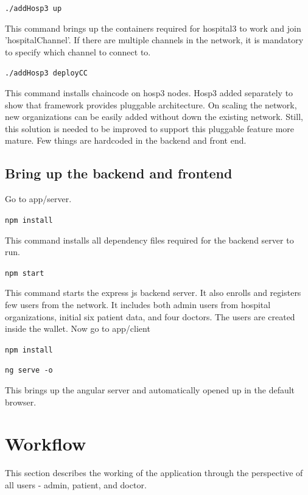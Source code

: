 \lstinline{./addHosp3 up}

This command brings up the containers required for hospital3 to work and join 'hospitalChannel'. If there are multiple channels in the network, it is mandatory to specify which channel to connect to. 

\lstinline{./addHosp3 deployCC} 

This command installs chaincode on hosp3 nodes. Hosp3 added separately to show that framework provides pluggable architecture. On scaling the network, new organizations can be easily added without down the existing network. Still, this solution is needed to be improved to support this pluggable feature more mature. Few things are hardcoded in the backend and front end.

\subsection{Bring up the backend and frontend}
\label{sec:implementation:steps:bringupbackend}

Go to app/server. 

\lstinline{npm install} 

This command installs all dependency files required for the backend server to run.

\lstinline{npm start} 

This command starts the express js backend server. It also enrolls and registers few users from the network. It includes both admin users from hospital organizations, initial six patient data, and four doctors. The users are created inside the wallet.  
Now go to app/client

\lstinline{npm install} 

\lstinline{ng serve -o} 

This brings up the angular server and automatically opened up in the default browser.   

%
%
\section{Workflow} 
\label{sec:implementation:screenshots}

This section describes the working of the application through the perspective of all users - admin, patient, and doctor.

